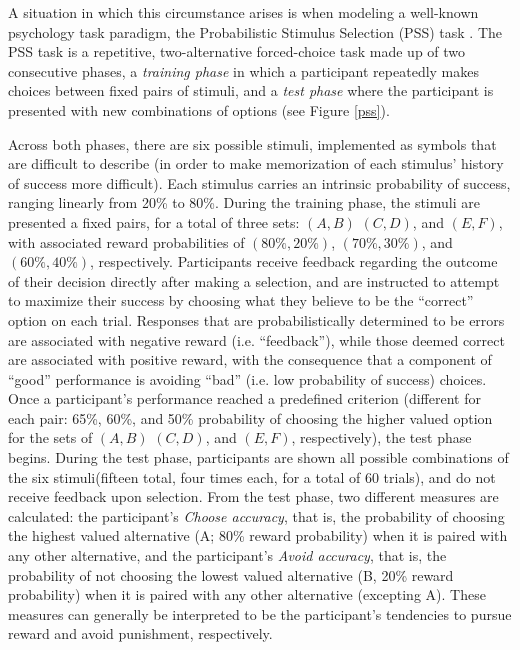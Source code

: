 \documentclass[10pt,letterpaper]{article}
\begin{document}
A situation in which this circumstance arises is when modeling a well-known psychology task paradigm, the Probabilistic Stimulus Selection (PSS) task \cite{frank2004carrot}. The PSS task is a repetitive, two-alternative forced-choice task made up of two consecutive phases, a \emph{training phase} in which a participant repeatedly makes choices between fixed pairs of stimuli, and a \emph{test phase} where the participant is presented with new combinations of options (see Figure \ref{pss}).

Across both phases, there are six possible stimuli, implemented as symbols that are difficult to describe (in order to make memorization of each stimulus’ history of success more difficult). Each stimulus carries an intrinsic probability of success, ranging linearly from 20\% to 80\%. During the training phase, the stimuli are presented a fixed pairs, for a total of three sets: $(A, B)$  $(C,D)$, and $(E, F)$, with associated reward probabilities of $(80\%, 20\%)$, $(70\%, 30\%)$, and $(60\%, 40\%)$, respectively. Participants receive feedback regarding the outcome of their decision directly after making a selection, and are instructed to attempt to maximize their success by choosing what they believe to be the ``correct'' option on each trial. {\color{red} Responses that are probabilistically determined to be errors are associated with negative reward (i.e. ``feedback''), while those deemed correct are associated with positive reward, with the consequence that a component of ``good'' performance is avoiding ``bad'' (i.e. low probability of success) choices.} Once a participant's performance reached a predefined criterion (different for each pair: 65\%, 60\%, and 50\% probability of choosing the higher valued option for the sets of $(A, B)$  $(C,D)$, and $(E, F)$, respectively), the test phase begins. During the test phase, participants are shown all possible combinations of the six stimuli(fifteen total, four times each, for a total of 60 trials), and do not receive feedback upon selection. From the test phase, two different measures are calculated: the participant's \emph{Choose accuracy}, that is, the probability of choosing the highest valued alternative (A; 80\% reward probability) when it is paired with any other alternative, and the participant's \emph{Avoid accuracy}, {\color{red} that} is, the probability of not choosing the lowest valued alternative (B, 20\% reward probability) when it is paired with any other alternative (excepting A). These measures can generally be interpreted to be the participant's tendencies to pursue reward and avoid punishment, respectively.
\end{document}
